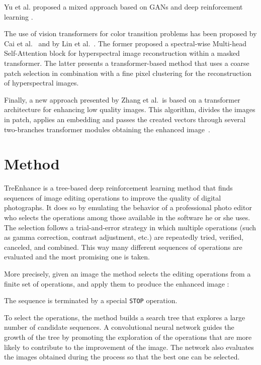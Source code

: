 \documentclass[3p,twocolumn]{elsarticle}
\newcommand{\method}[0]{TreEnhance}
\begin{document}
Yu et al. proposed a mixed approach based on GANs and deep reinforcement learning \cite{yu2018deepexposure}.

The use of vision transformers for color transition problems has been proposed by Cai et al.~\cite{cai2022mask} and by Lin et al.~\cite{lin2022coarse}.  The former proposed a spectral-wise Multi-head Self-Attention block for hyperspectral image reconstruction within a masked transformer. The latter presents a transformer-based method that uses a coarse patch selection in combination with a fine pixel clustering for the reconstruction of hyperspectral images.


Finally, a new approach presented by Zhang et al.\ is based on a transformer architecture for enhancing low quality images. This algorithm, divides the images in patch, applies an embedding and passes the created vectors through several two-branches transformer modules obtaining the enhanced image~\cite{zhang2021star}.


\section{Method}
\label{sec:method}

\method{} is a tree-based deep reinforcement learning method that finds sequences of image editing operations to improve the quality of digital photographs.  It does so by emulating the behavior of a professional photo editor who selects the operations among those available in the software he or she uses.  The selection follows a trial-and-error strategy in which multiple operations (such as gamma correction, contrast adjustment, etc.) are repeatedly tried, verified, canceled, and combined.  This way many different sequences of operations are evaluated and the most promising one is taken.   


More precisely, given an image  the method selects the editing operations  from a finite set  of operations, and apply them to produce the enhanced image :

The sequence is terminated by a special \texttt{STOP} operation.

To select the operations, the method builds a search tree that explores a large number of candidate sequences.
A convolutional neural network guides the growth of the tree by promoting the exploration of the operations that are more likely to contribute to the improvement of the image.  The network also evaluates the images obtained during the process so that the best one can be selected.
\end{document}
